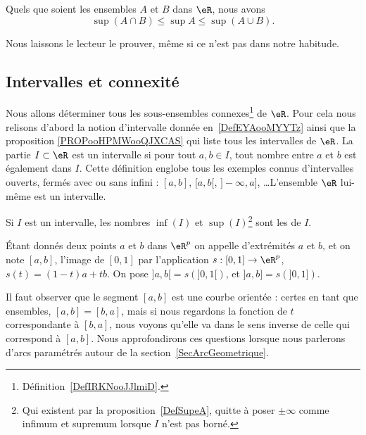 \begin{proposition}     \label{PROPooANIOooIJHelX}
Quels que soient les ensembles $A$ et $B$ dans $\eR$, nous avons
\[
  \sup(A\cap B)\leq\sup A\leq\sup(A\cup B).
\]
\end{proposition}
Nous laissons le lecteur le prouver, même si ce n'est pas dans notre habitude.

\subsection{Intervalles et connexité}

Nous allons déterminer tous les sous-ensembles connexes\footnote{Définition~\ref{DefIRKNooJJlmiD}.} de $\eR$. Pour cela nous relisons d'abord la notion d'intervalle donnée en~\ref{DefEYAooMYYTz} ainsi que la proposition \ref{PROPooHPMWooQJXCAS} qui liste tous les intervalles de \( \eR\). La partie \( I\subset \eR\) est un intervalle si pour tout \( a,b\in I\), tout nombre entre \( a\) et \( b\) est également dans \( I\). Cette définition englobe tous les exemples connus d'intervalles ouverts, fermés avec ou sans infini : $[a,b]$, $[a,b[$, $]-\infty,a]$, \ldots L'ensemble \( \eR\) lui-même est un intervalle.

Si \( I\) est un intervalle, les nombres \( \inf(I)\) et \( \sup(I)\)\footnote{Qui existent par la proposition~\ref{DefSupeA}, quitte à poser \( \pm\infty\) comme infimum et supremum lorsque \( I\) n'est pas borné.} sont les  de \( I\).

\begin{definition}      \label{DefLISOooDHLQrl}
	Étant donnés deux points $a$ et $b$ dans $\eR^p$ on appelle  d'extrémités $a$ et $b$, et on note $[a,b]$, l'image de $[0,1]$ par l'application $s: [0,1]\to \eR^p$, $s(t)= (1-t)a+tb$.  On pose $]a,b[=s\left(]0,1[\right)$, et  $]a,b]=s\left(]0,1]\right)$.
\end{definition}
Il faut observer que le segment $[a,b]$ est une courbe orientée : certes en tant que ensembles, $[a,b]=[b,a]$, mais si nous regardons la fonction de $t$ correspondante à $[b,a]$, nous voyons qu'elle va dans le sens inverse de celle qui correspond à $[a,b]$. Nous approfondirons ces questions lorsque nous parlerons d'arcs paramétrés autour de la section~\ref{SecArcGeometrique}.

